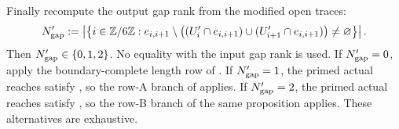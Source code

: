 Finally recompute the output gap rank from the modified open traces:
\[
 N'_{\rm gap}:=
 \left|\left\{i\in\mathbb Z/6\mathbb Z:
 e_{i,i+1}\setminus
 \bigl((U'_i\cap e_{i,i+1})\cup(U'_{i+1}\cap e_{i,i+1})\bigr)
 \ne\varnothing\right\}\right|.
\]
Then \(N'_{\rm gap}\in\{0,1,2\}\).  No equality with the input gap rank is
used.  If \(N'_{\rm gap}=0\), apply the boundary-complete length
row of .  If \(N'_{\rm gap}=1\), the primed
actual reaches satisfy
, so the row-A branch of
 applies.  If
\(N'_{\rm gap}=2\), the primed actual reaches satisfy
, so the row-B branch of the same
proposition applies.  These alternatives are exhaustive.
